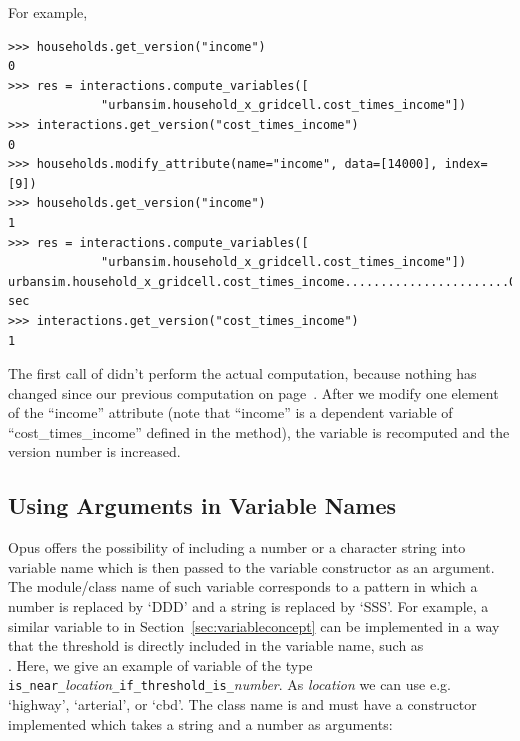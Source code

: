 For example,

\begin{verbatim}
>>> households.get_version("income")
0
>>> res = interactions.compute_variables([
             "urbansim.household_x_gridcell.cost_times_income"])
>>> interactions.get_version("cost_times_income")
0
>>> households.modify_attribute(name="income", data=[14000], index=[9])
>>> households.get_version("income")
1
>>> res = interactions.compute_variables([
             "urbansim.household_x_gridcell.cost_times_income"])
urbansim.household_x_gridcell.cost_times_income.......................0.0 sec
>>> interactions.get_version("cost_times_income")
1
\end{verbatim}

The first call of  didn't perform the actual
computation, because nothing has changed since our previous computation on
page~\pageref{page:compute-interaction}.
After we modify one element of the ``income'' attribute
(note that ``income'' is a dependent variable of
``cost_times_income'' defined in the  method), the
variable is recomputed and the version number is increased.

\subsection{Using Arguments in Variable Names}
\label{sec:tutorial-numbersinvariables}

Opus offers the possibility of including a number or a character string into
variable name which is then passed to the variable constructor as an argument.
The module/class name of such variable corresponds to a pattern in which a
number is replaced by `DDD' and a string is replaced by `SSS'\@.  For example,
a similar variable to  in Section~\ref{sec:variableconcept} can be
implemented in a way that the threshold is directly included in the variable
name, such as \\
. Here, we give an example of variable
of the type \verb|is_near_|{\em location}\verb|_if_threshold_is_|{\em number}.
As {\em location} we can use e.g. `highway',  `arterial', or `cbd'.
The class name is  and must have a
constructor implemented which takes a string and a number as arguments:

